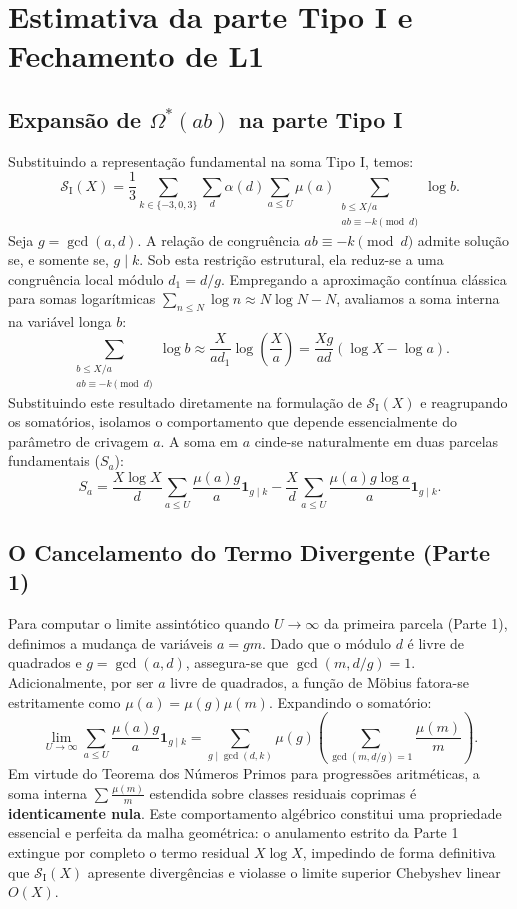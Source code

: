 \documentclass[12pt]{article}
\theoremstyle{definition}
\theoremstyle{remark}
\newcommand{\Omstar}{\Omega^*}
\newcommand{\SI}{\mathcal{S}_{\mathrm{I}}}
\begin{document}
	\section{Estimativa da parte Tipo I e Fechamento de L1}
	\label{sec:tipoI}
	
	\subsection{Expansão de $\Omstar(ab)$ na parte Tipo I}
	
	Substituindo a representação fundamental na soma Tipo I, temos:
	\[
	\SI(X) = \frac{1}{3} \sum_{k \in \{-3,0,3\}} \sum_{d} \alpha(d) \sum_{a \le U} \mu(a) \sum_{\substack{b \le X/a \\ ab \equiv -k \pmod{d}}} \log b.
	\]
	Seja $g = \gcd(a,d)$. A relação de congruência $ab \equiv -k \pmod{d}$ admite solução se, e somente se, $g \mid k$. Sob esta restrição estrutural, ela reduz-se a uma congruência local módulo $d_1 = d/g$. Empregando a aproximação contínua clássica para somas logarítmicas $\sum_{n \le N} \log n \approx N \log N - N$, avaliamos a soma interna na variável longa $b$:
	\[
	\sum_{\substack{b \le X/a \\ ab \equiv -k \pmod{d}}} \log b \approx \frac{X}{a d_1} \log\left(\frac{X}{a}\right) = \frac{X g}{a d} (\log X - \log a).
	\]
	Substituindo este resultado diretamente na formulação de $\SI(X)$ e reagrupando os somatórios, isolamos o comportamento que depende essencialmente do parâmetro de crivagem $a$. A soma em $a$ cinde-se naturalmente em duas parcelas fundamentais ($S_a$):
	\[
	S_a = \frac{X \log X}{d} \sum_{a \le U} \frac{\mu(a) g}{a} \mathbf{1}_{g \mid k} - \frac{X}{d} \sum_{a \le U} \frac{\mu(a) g \log a}{a} \mathbf{1}_{g \mid k}.
	\]
	
	\subsection{O Cancelamento do Termo Divergente (Parte 1)}
	
	Para computar o limite assintótico quando $U \to \infty$ da primeira parcela (Parte 1), definimos a mudança de variáveis $a = gm$. Dado que o módulo $d$ é livre de quadrados e $g = \gcd(a,d)$, assegura-se que $\gcd(m, d/g) = 1$. Adicionalmente, por ser $a$ livre de quadrados, a função de Möbius fatora-se estritamente como $\mu(a) = \mu(g)\mu(m)$. Expandindo o somatório:
	\[
	\lim_{U \to \infty} \sum_{a \le U} \frac{\mu(a) g}{a} \mathbf{1}_{g \mid k} = \sum_{g \mid \gcd(d,k)} \mu(g) \left( \sum_{\gcd(m, d/g) = 1} \frac{\mu(m)}{m} \right).
	\]
	Em virtude do Teorema dos Números Primos para progressões aritméticas, a soma interna $\sum \frac{\mu(m)}{m}$ estendida sobre classes residuais coprimas é \textbf{identicamente nula}. Este comportamento algébrico constitui uma propriedade essencial e perfeita da malha geométrica: o anulamento estrito da Parte 1 extingue por completo o termo residual $X \log X$, impedindo de forma definitiva que $\SI(X)$ apresente divergências e violasse o limite superior Chebyshev linear $O(X)$.
	
\end{document}
